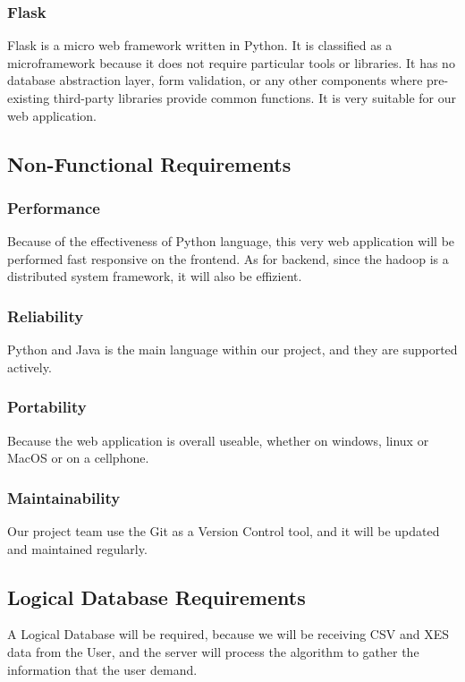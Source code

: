 \documentclass[runningheads]{llncs}
\begin{document}
\subsubsection{Flask}
Flask\cite{Flask} is a micro web framework written in Python. It is classified as a microframework because it does not require particular tools or libraries. It has no database abstraction layer, form validation, or any other components where pre-existing third-party libraries provide common functions. It is very suitable for our web application.

\subsection{Non-Functional Requirements}

\subsubsection{Performance}
Because of the effectiveness of Python language, this very web application will be performed fast responsive on the frontend. As for backend, since the hadoop is a distributed system framework, it will also be effizient.
\subsubsection{Reliability}
Python and Java is the main language within our project, and they are supported actively.
\subsubsection{Portability}
Because the web application is overall useable, whether on windows, linux or MacOS or on a cellphone.
\subsubsection{Maintainability}
Our project team use the Git as a Version Control tool, and it will be updated and maintained regularly.

\subsection{Logical Database Requirements}
A Logical Database will be required, because we will be receiving CSV and XES data from the User, and the server will process the algorithm to gather the information that the user demand.





\end{document}
